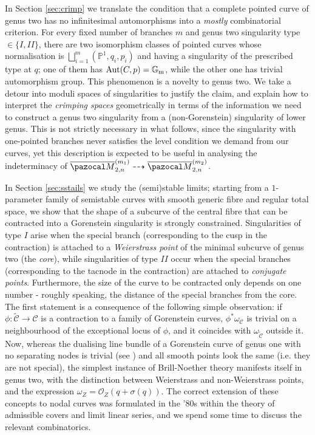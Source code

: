 \documentclass[11pt]{amsart}
\newcommand{\PP}{\mathbb P}
\newcommand{\OO}{\mathcal O}
\renewcommand{\to}{\rightarrow}
\newcommand{\oM}{\overline{\pazocal M}}
\newcommand{\Gm}{\mathbb{G}_{\rm{m}}}
\newcommand{\Aut}{\operatorname{Aut}}
\theoremstyle{plain}
\theoremstyle{definition}
\begin{document}
In Section \ref{sec:crimp} we translate the condition that a complete pointed curve of genus two has no infinitesimal automorphisms into a \emph{mostly} combinatorial criterion. For every fixed number of branches $m$ and genus two singularity type $\in\{I,I\!I\}$, there are two isomorphism classes of pointed curves whose normalisation is $\bigsqcup_{i=1}^m(\PP^1,q_i,p_i)$ and having a singularity of the prescribed type at $q$; one of them has $\Aut(C,p)=\Gm$, while the other one has trivial automorphism group. This phenomenon is a novelty to genus two. We take a detour into moduli spaces of singularities to justify the claim, and explain how to interpret the \emph{crimping spaces} geometrically in terms of the information we need to construct a genus two singularity from a (non-Gorenstein) singularity of lower genus. This is not strictly necessary in what follows, since the singularity with one-pointed branches never satisfies the level condition we demand from our curves, yet this description is expected to be useful in analysing the indeterminacy of $\oM_{2,n}^{(m_1)}\dashrightarrow\oM_{2,n}^{(m_2)}$.

In Section \ref{sec:sstails} we study the (semi)stable limits; starting from a $1$-parameter family of semistable curves with smooth generic fibre and regular total space, we show that the shape of a subcurve of the central fibre that can be contracted into a Gorenstein singularity is strongly constrained. Singularities of type $I$ arise when the special branch (corresponding to the cusp in the contraction) is attached to a \emph{Weierstrass point} of the minimal subcurve of genus two (the \emph{core}), while singularities of type $I\!I$ occur when the special branches (corresponding to the tacnode in the contraction) are attached to \emph{conjugate points}. Furthermore, the size of the curve to be contracted only depends on one number - roughly speaking, the distance of the special branches from the core. The first statement is a consequence of the following simple observation: if $\phi\colon\widetilde{\mathcal C}\to\mathcal C$ is a contraction to a family of Gorenstein curves, $\phi^*\omega_{\mathcal C}$ is trivial on a neighbourhood of the exceptional locus of $\phi$, and it coincides with $\omega_{\widetilde{\mathcal C}}$ outside it. Now, whereas the dualising line bundle of a Gorenstein curve of genus one with no separating nodes is trivial (see \cite[Lemma 3.3]{SMY1}) and all smooth points look the same (i.e. they are not special), the simplest instance of Brill-Noether theory manifests itself in genus two, with the distinction between Weierstrass and non-Weierstrass points, and the expression $\omega_Z=\OO_Z(q+\sigma(q))$. The correct extension of these concepts to nodal curves was formulated in the '80s within the theory of admissible covers and limit linear series, and we spend some time to discuss the relevant combinatorics.
\end{document}
